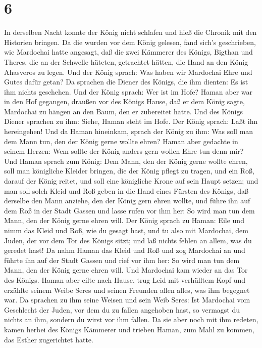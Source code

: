 \hypertarget{section-5}{%
\section{6}\label{section-5}}

 In derselben Nacht konnte der König nicht schlafen und hieß
die Chronik mit den Historien bringen. Da die wurden vor dem König
gelesen,  fand sich's geschrieben, wie Mardochai hatte
angesagt, daß die zwei Kämmerer des Königs, Bigthan und Theres, die an
der Schwelle hüteten, getrachtet hätten, die Hand an den König Ahasveros
zu legen.  Und der König sprach: Was haben wir Mardochai
Ehre und Gutes dafür getan? Da sprachen die Diener des Königs, die ihm
dienten: Es ist ihm nichts geschehen.  Und der König sprach:
Wer ist im Hofe? Haman aber war in den Hof gegangen, draußen vor des
Königs Hause, daß er dem König sagte, Mardochai zu hängen an den Baum,
den er zubereitet hatte.  Und des Königs Diener sprachen zu
ihm: Siehe, Haman steht im Hofe. Der König sprach: Laßt ihn hereingehen!
 Und da Haman hineinkam, sprach der König zu ihm: Was soll
man dem Mann tun, den der König gerne wollte ehren? Haman aber gedachte
in seinem Herzen: Wem sollte der König anders gern wollen Ehre tun denn
mir?  Und Haman sprach zum König: Dem Mann, den der König
gerne wollte ehren,  soll man königliche Kleider bringen,
die der König pflegt zu tragen, und ein Roß, darauf der König reitet,
und soll eine königliche Krone auf sein Haupt setzen;  und
man soll solch Kleid und Roß geben in die Hand eines Fürsten des Königs,
daß derselbe den Mann anziehe, den der König gern ehren wollte, und
führe ihn auf dem Roß in der Stadt Gassen und lasse rufen vor ihm her:
So wird man tun dem Mann, den der König gerne ehren will. 
Der König sprach zu Haman: Eile und nimm das Kleid und Roß, wie du
gesagt hast, und tu also mit Mardochai, dem Juden, der vor dem Tor des
Königs sitzt; und laß nichts fehlen an allem, was du geredet hast!
 Da nahm Haman das Kleid und Roß und zog Mardochai an und
führte ihn auf der Stadt Gassen und rief vor ihm her: So wird man tun
dem Mann, den der König gerne ehren will.  Und Mardochai
kam wieder an das Tor des Königs. Haman aber eilte nach Hause, trug Leid
mit verhülltem Kopf  und erzählte seinem Weibe Seres und
seinen Freunden allen alles, was ihm begegnet war. Da sprachen zu ihm
seine Weisen und sein Weib Seres: Ist Mardochai vom Geschlecht der
Juden, vor dem du zu fallen angehoben hast, so vermagst du nichts an
ihm, sondern du wirst vor ihm fallen.  Da sie aber noch mit
ihm redeten, kamen herbei des Königs Kämmerer und trieben Haman, zum
Mahl zu kommen, das Esther zugerichtet hatte.

